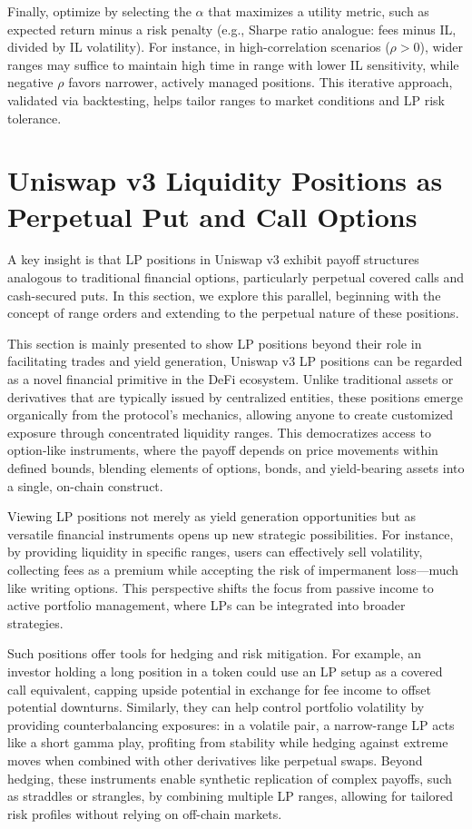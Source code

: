 \documentclass{article}
\begin{document}
Finally, optimize by selecting the \(\alpha\) that maximizes a utility metric, such as expected return minus a risk penalty (e.g., Sharpe ratio analogue: fees minus IL, divided by IL volatility). For instance, in high-correlation scenarios (\(\rho > 0\)), wider ranges may suffice to maintain high time in range with lower IL sensitivity, while negative \(\rho\) favors narrower, actively managed positions. This iterative approach, validated via backtesting, helps tailor ranges to market conditions and LP risk tolerance.
\newpage

\section{Uniswap v3 Liquidity Positions as Perpetual Put and Call Options}

A key insight is that LP positions in Uniswap v3 exhibit payoff structures analogous to traditional financial options, particularly perpetual covered calls and cash-secured puts. In this section, we explore this parallel, beginning with the concept of range orders and extending to the perpetual nature of these positions.

This section is mainly presented to show LP positions beyond their role in facilitating trades and yield generation, Uniswap v3 LP positions can be regarded as a novel financial primitive in the DeFi ecosystem. Unlike traditional assets or derivatives that are typically issued by centralized entities, these positions emerge organically from the protocol's mechanics, allowing anyone to create customized exposure through concentrated liquidity ranges. This democratizes access to option-like instruments, where the payoff depends on price movements within defined bounds, blending elements of options, bonds, and yield-bearing assets into a single, on-chain construct.

Viewing LP positions not merely as yield generation opportunities but as versatile financial instruments opens up new strategic possibilities. For instance, by providing liquidity in specific ranges, users can effectively sell volatility, collecting fees as a premium while accepting the risk of impermanent loss—much like writing options. This perspective shifts the focus from passive income to active portfolio management, where LPs can be integrated into broader strategies.

Such positions offer tools for hedging and risk mitigation. For example, an investor holding a long position in a token could use an LP setup as a covered call equivalent, capping upside potential in exchange for fee income to offset potential downturns. Similarly, they can help control portfolio volatility by providing counterbalancing exposures: in a volatile pair, a narrow-range LP acts like a short gamma play, profiting from stability while hedging against extreme moves when combined with other derivatives like perpetual swaps. Beyond hedging, these instruments enable synthetic replication of complex payoffs, such as straddles or strangles, by combining multiple LP ranges, allowing for tailored risk profiles without relying on off-chain markets.
\end{document}
